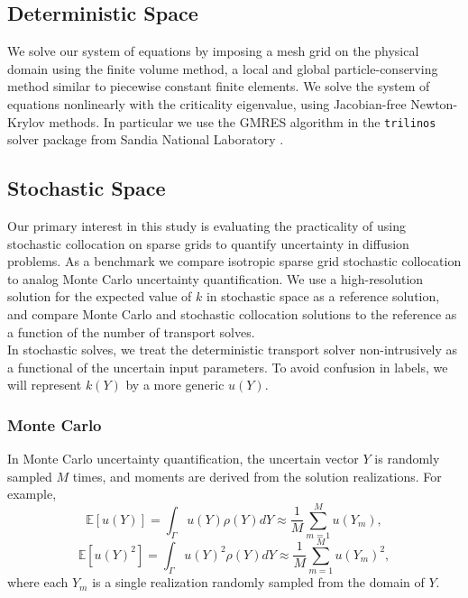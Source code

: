 \documentclass[11pt]{article}
\newcommand{\expv}[1]{\ensuremath{\mathbb{E}[ #1]}}
\begin{document}
\subsection{Deterministic Space}
We solve our system of equations by imposing a mesh grid on the physical domain using the finite volume method, a local and global particle-conserving method similar to piecewise constant finite elements.  We solve the system of equations nonlinearly with the criticality eigenvalue, using Jacobian-free Newton-Krylov methods.  In particular we use the GMRES algorithm in the \texttt{trilinos} solver package from Sandia National Laboratory \cite{Trilinos-Overview}.  

\subsection{Stochastic Space}
Our primary interest in this study is evaluating the practicality of using stochastic collocation on sparse grids \cite{sparse1}\cite{sparse2}\cite{sparseSC} to quantify uncertainty in diffusion problems.  As a benchmark we compare isotropic sparse grid stochastic collocation to analog Monte Carlo uncertainty quantification.  We use a high-resolution solution for the expected value of $k$ in stochastic space as a reference solution, and compare Monte Carlo and stochastic collocation solutions to the reference as a function of the number of transport solves. \\

In stochastic solves, we treat the deterministic transport solver non-intrusively as a functional of the uncertain input parameters.  To avoid confusion in labels, we will represent $k(Y)$ by a more generic $u(Y)$.

\subsubsection{Monte Carlo}
In Monte Carlo uncertainty quantification, the uncertain vector $Y$ is randomly sampled $M$ times, and moments are derived from the solution realizations.  For example, 
\begin{equation}
\expv{u(Y)} = \int_\Gamma u(Y) \rho(Y) dY\approx \frac{1}{M}\sum_{m=1}^M u(Y_m),
\end{equation}
\begin{equation}
\expv{u(Y)^2} = \int_\Gamma u(Y)^2 \rho(Y) dY\approx \frac{1}{M}\sum_{m=1}^M u(Y_m)^2,
\end{equation}
where each $Y_m$ is a single realization randomly sampled from the domain of $Y$.
\end{document}
